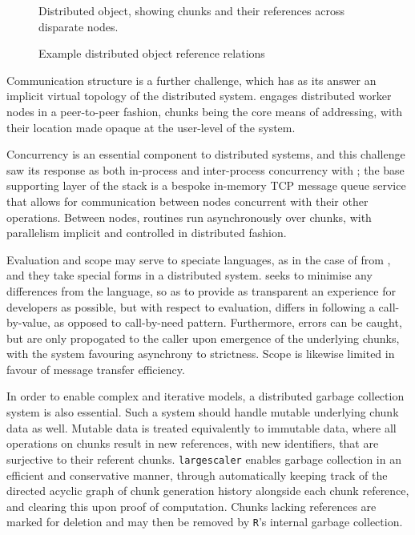 \begin{figure}[ht]
\begin{center}

\caption{Distributed object, showing chunks and their references across disparate nodes.}
\label{fig:distobj}
\end{center}
\end{figure}

\begin{figure}[ht]
\begin{center}

\caption{\label{fig:top} Example distributed object reference relations}
\end{center}
\end{figure}

Communication structure is a further challenge, which has as its answer an implicit virtual topology of the distributed system.
\lsr engages distributed worker nodes in a peer-to-peer fashion, chunks being the core means of addressing, with their location made opaque at the user-level of the system.

Concurrency is an essential component to distributed systems, and this challenge saw its response as both in-process and inter-process concurrency with \lsr; the base supporting layer of the \lsr stack is a bespoke in-memory TCP message queue service that allows for communication between nodes concurrent with their other operations.
Between nodes, routines run asynchronously over chunks, with parallelism implicit and controlled in distributed fashion.

Evaluation and scope may serve to speciate languages, as in the case of \R from , and they take special forms in a distributed system.
\lsr seeks to minimise any differences from the \R language, so as to provide as transparent an experience for developers as possible, but with respect to evaluation, differs in following a call-by-value, as opposed to call-by-need pattern. Furthermore, errors can be caught, but are only propogated to the caller upon emergence of the underlying chunks, with the system favouring asynchrony to strictness. Scope is likewise limited in favour of message transfer efficiency.

In order to enable complex and iterative models, a distributed garbage collection system is also essential.
Such a system should handle mutable underlying chunk data as well.
Mutable data is treated equivalently to immutable data, where all operations on chunks result in new references, with new identifiers, that are surjective to their referent chunks.
\texttt{largescaler} enables garbage collection in an efficient and conservative manner, through automatically keeping track of the directed acyclic graph of chunk generation history alongside each chunk reference, and clearing this upon proof of computation.
Chunks lacking references are marked for deletion and may then be removed by \texttt{R}'s internal garbage collection.

